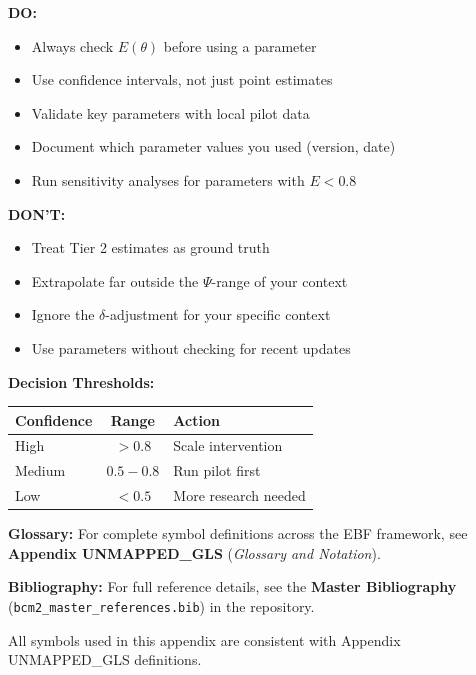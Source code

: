 \documentclass[11pt,a4paper]{article}
\theoremstyle{definition}
\begin{document}
\begin{tcolorbox}[colback=yellow!5!white, colframe=yellow!75!black, 
    title=\textbf{For Practitioners: Using BBB Estimates}]

\textbf{DO:}
\begin{itemize}[nosep]
    \item Always check $E(\theta)$ before using a parameter
    \item Use confidence intervals, not just point estimates
    \item Validate key parameters with local pilot data
    \item Document which parameter values you used (version, date)
    \item Run sensitivity analyses for parameters with $E < 0.8$
\end{itemize}

\textbf{DON'T:}
\begin{itemize}[nosep]
    \item Treat Tier 2 estimates as ground truth
    \item Extrapolate far outside the $\Psi$-range of your context
    \item Ignore the $\delta$-adjustment for your specific context
    \item Use parameters without checking for recent updates
\end{itemize}

\textbf{Decision Thresholds:}
\begin{center}
\begin{tabular}{@{}lcl@{}}
\toprule
\textbf{Confidence} & \textbf{Range} & \textbf{Action} \\
\midrule
High & $> 0.8$ & Scale intervention \\
Medium & $0.5 - 0.8$ & Run pilot first \\
Low & $< 0.5$ & More research needed \\
\bottomrule
\end{tabular}
\end{center}

\end{tcolorbox}





\begin{tcolorbox}[colback=blue!5!white, colframe=blue!75!black, 
    title=\textbf{Central References}]

\textbf{Glossary:} For complete symbol definitions across the EBF framework, 
see \textbf{Appendix UNMAPPED_GLS} (\textit{Glossary and Notation}).

\textbf{Bibliography:} For full reference details, see the 
\textbf{Master Bibliography} (\texttt{bcm2\_master\_references.bib}) 
in the repository.

All symbols used in this appendix are consistent with Appendix UNMAPPED_GLS definitions.

\end{tcolorbox}
\end{document}
